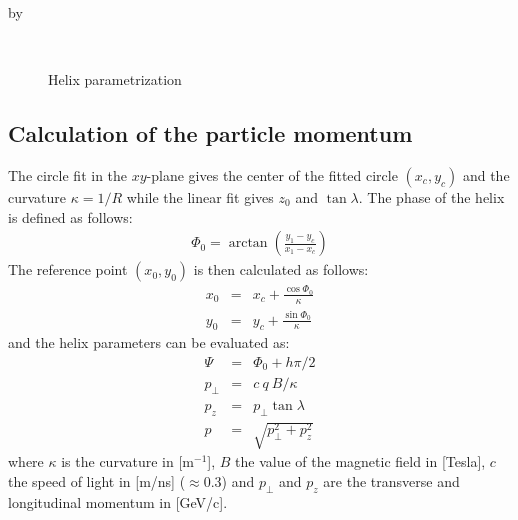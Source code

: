 \documentclass[twoside]{article}
\newcommand{\entrylabel}[1]{\mbox{\textbf{{#1}}}\hfil}%
\newenvironment{entry}
{\begin{list}{}%
    {\renewcommand{\makelabel}{\entrylabel}%
     \setlength{\labelwidth}{90pt}%
     \setlength{\leftmargin}{\labelwidth}
     \advance\leftmargin by \labelsep%
      }%
    }%
  {\end{list}}
\newcommand{\Entrylabel}[1]%
{\raisebox{0pt}[1ex][0pt]{\makebox[\labelwidth][l]%
    {\parbox[t]{\labelwidth}{\hspace{0pt}\textbf{{#1}}}}}}
\newenvironment{Entry}%
{\renewcommand{\entrylabel}{\Entrylabel}\begin{entry}}%
  {\end{entry}}
\begin{document}
\begin{description}
\begin{Entry}
\begin{figure}[thb]
\mbox{
  \quad
  }
  \caption{Helix parametrization}
  \label{fig:helix}
\end{figure}

\subsection{Calculation of the particle momentum}

The circle fit in the $xy$-plane gives the center of the fitted circle $(x_c, y_c)$
and the curvature $\kappa = 1/R$ while the linear fit gives $z_0$ and $\tan \lambda$.
The phase of the helix is defined as follows:
\begin{eqnarray}
  \Phi_0 = \arctan \left( \frac{y_1 - y_c}{x_1 - x_c} \right)
\end{eqnarray}
The reference point $(x_0, y_0)$ is then calculated as follows:
\begin{eqnarray}
  x_0 & = & x_c + \frac{\cos \Phi_0}{\kappa} \\
  y_0 & = & y_c + \frac{\sin \Phi_0}{\kappa}
\end{eqnarray}
and the helix parameters can be evaluated as:
\begin{eqnarray}
  \Psi & = & \Phi_0 + h \pi / 2 \\
  p_\perp & = & c\ q\ B / \kappa \\
  p_z & = & p_\perp \tan \lambda \\
  p & = & \sqrt{p^2_\perp + p^2_z}
\end{eqnarray}
where $\kappa$ is the curvature in [m$^{-1}$], $B$ the value of the
magnetic field in [Tesla], $c$ the speed of light in [m/ns] ($\approx
0.3$) and $p_\perp$ and $p_z$ are the transverse and longitudinal
momentum in [GeV/c].


\end{Entry}
\end{description}
\end{document}
